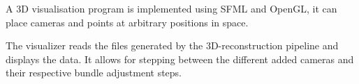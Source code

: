 A 3D visualisation program is implemented using SFML and OpenGL, it can place cameras and points at arbitrary positions in space.

The visualizer reads the files generated by the 3D-reconstruction pipeline and displays the data. It allows for stepping between the different
added cameras and their respective bundle adjustment steps.